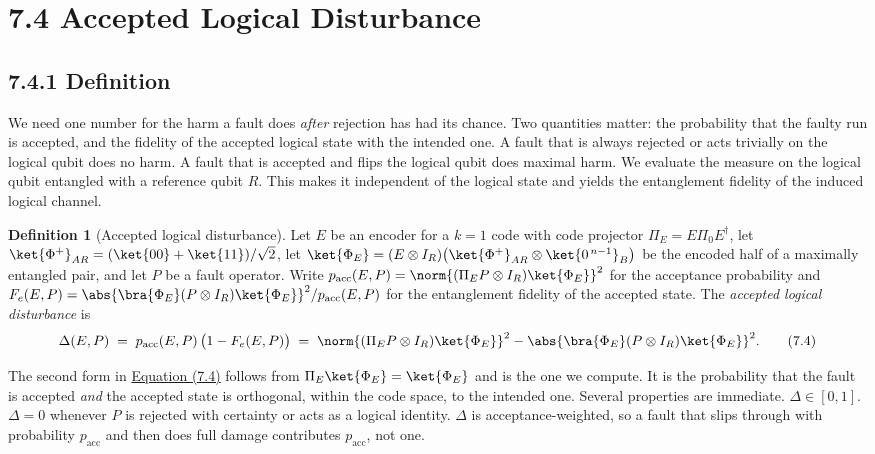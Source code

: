 \documentclass{report}
\theoremstyle{plain}
\theoremstyle{definition}
\newtheorem{definition}[theorem]{Definition}
\theoremstyle{remark}
\begin{document}
\section{7.4 Accepted Logical Disturbance}\label{sec:qec:disturbance}

\subsection{7.4.1 Definition}\label{sec:qec:definition}

We need one number for the harm a fault does \emph{after} rejection has had its chance. Two quantities matter: the probability that the faulty run is accepted, and the fidelity of the accepted logical state with the intended one. A fault that is always rejected or acts trivially on the logical qubit does no harm. A fault that is accepted and flips the logical qubit does maximal harm. We evaluate the measure on the logical qubit entangled with a reference qubit $R$. This makes it independent of the logical state and yields the entanglement fidelity of the induced logical channel.

\begin{definition}[Accepted logical disturbance]\label{def:qec:disturbance}
Let $E$ be an encoder for a $k=1$ code with code projector $\Pi_E=E\Pi_0E^{\dagger}$, let $\ket{\Phi^{+}}_{AR}=(\ket{00}+\ket{11})/\sqrt2$, let $\ket{\Phi_E}=(E\otimes I_R)\big(\ket{\Phi^{+}}_{AR}\otimes\ket{0^{\,n-1}}_B\big)$ be the encoded half of a maximally entangled pair, and let $P$ be a fault operator. Write $p_{\mathrm{acc}}(E,P)=\norm{(\Pi_E P\otimes I_R)\ket{\Phi_E}}^{2}$ for the acceptance probability and $F_e(E,P)=\abs{\bra{\Phi_E}(P\otimes I_R)\ket{\Phi_E}}^{2}/p_{\mathrm{acc}}(E,P)$ for the entanglement fidelity of the accepted state. The \emph{accepted logical disturbance} is
\hypertarget{eq:qec:disturbance}{}\[
  \Delta(E,P)\;=\;p_{\mathrm{acc}}(E,P)\,\big(1-F_e(E,P)\big)
  \;=\;\norm{(\Pi_E P\otimes I_R)\ket{\Phi_E}}^{2}-\abs{\bra{\Phi_E}(P\otimes I_R)\ket{\Phi_E}}^{2}.
\tag{7.4}\]
\end{definition}

The second form in \hyperref[eq:qec:disturbance]{Equation (7.4)} follows from $\Pi_E\ket{\Phi_E}=\ket{\Phi_E}$ and is the one we compute. It is the probability that the fault is accepted \emph{and} the accepted state is orthogonal, within the code space, to the intended one. Several properties are immediate. $\Delta\in[0,1]$. $\Delta=0$ whenever $P$ is rejected with certainty or acts as a logical identity. $\Delta$ is acceptance-weighted, so a fault that slips through with probability $p_{\mathrm{acc}}$ and then does full damage contributes $p_{\mathrm{acc}}$, not one.
\end{document}
